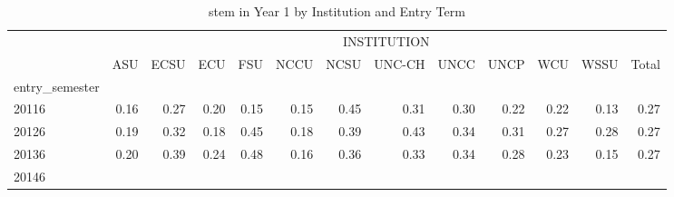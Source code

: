 \begin{table}[!h]
\caption{stem in Year 1 by Institution and Entry Term}
\centering
\begin{tabular}{lllllllllllll}
\cline{1-13}
\multicolumn{1}{c}{} &
  \multicolumn{12}{|c}{INSTITUTION} \\
\multicolumn{1}{c}{} &
  \multicolumn{1}{|r}{ASU} &
  \multicolumn{1}{r}{ECSU} &
  \multicolumn{1}{r}{ECU} &
  \multicolumn{1}{r}{FSU} &
  \multicolumn{1}{r}{NCCU} &
  \multicolumn{1}{r}{NCSU} &
  \multicolumn{1}{r}{UNC-CH} &
  \multicolumn{1}{r}{UNCC} &
  \multicolumn{1}{r}{UNCP} &
  \multicolumn{1}{r}{WCU} &
  \multicolumn{1}{r}{WSSU} &
  \multicolumn{1}{r}{Total} \\
\cline{1-13}
\multicolumn{1}{l}{entry\_semester} &
  \multicolumn{1}{|r}{} &
  \multicolumn{1}{r}{} &
  \multicolumn{1}{r}{} &
  \multicolumn{1}{r}{} &
  \multicolumn{1}{r}{} &
  \multicolumn{1}{r}{} &
  \multicolumn{1}{r}{} &
  \multicolumn{1}{r}{} &
  \multicolumn{1}{r}{} &
  \multicolumn{1}{r}{} &
  \multicolumn{1}{r}{} &
  \multicolumn{1}{r}{} \\
\multicolumn{1}{l}{\hspace{1em}20116} &
  \multicolumn{1}{|r}{0.16} &
  \multicolumn{1}{r}{0.27} &
  \multicolumn{1}{r}{0.20} &
  \multicolumn{1}{r}{0.15} &
  \multicolumn{1}{r}{0.15} &
  \multicolumn{1}{r}{0.45} &
  \multicolumn{1}{r}{0.31} &
  \multicolumn{1}{r}{0.30} &
  \multicolumn{1}{r}{0.22} &
  \multicolumn{1}{r}{0.22} &
  \multicolumn{1}{r}{0.13} &
  \multicolumn{1}{r}{0.27} \\
\multicolumn{1}{l}{\hspace{1em}20126} &
  \multicolumn{1}{|r}{0.19} &
  \multicolumn{1}{r}{0.32} &
  \multicolumn{1}{r}{0.18} &
  \multicolumn{1}{r}{0.45} &
  \multicolumn{1}{r}{0.18} &
  \multicolumn{1}{r}{0.39} &
  \multicolumn{1}{r}{0.43} &
  \multicolumn{1}{r}{0.34} &
  \multicolumn{1}{r}{0.31} &
  \multicolumn{1}{r}{0.27} &
  \multicolumn{1}{r}{0.28} &
  \multicolumn{1}{r}{0.27} \\
\multicolumn{1}{l}{\hspace{1em}20136} &
  \multicolumn{1}{|r}{0.20} &
  \multicolumn{1}{r}{0.39} &
  \multicolumn{1}{r}{0.24} &
  \multicolumn{1}{r}{0.48} &
  \multicolumn{1}{r}{0.16} &
  \multicolumn{1}{r}{0.36} &
  \multicolumn{1}{r}{0.33} &
  \multicolumn{1}{r}{0.34} &
  \multicolumn{1}{r}{0.28} &
  \multicolumn{1}{r}{0.23} &
  \multicolumn{1}{r}{0.15} &
  \multicolumn{1}{r}{0.27} \\
\multicolumn{1}{l}{\hspace{1em}20146} &

\end{tabular}
\end{table}
